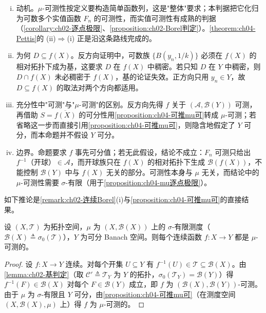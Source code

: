 \documentclass[../../main.tex]{subfiles}%
\begin{document}
\begin{remark}\label{remark:ch04-可分值判据动机}
\begin{enumerate}[(i)]
\item 动机。$\mu$-可测性按定义要构造简单函数列，这是"整体"要求；本判据把它化归为可数多个实值函数 $F_n$ 的可测性，而实值可测性有成熟的判据（\cref{corollary:ch02-逐点极限}、\cref{proposition:ch02-Borel判定}）。\cref{theorem:ch04-Pettis}的 (ii)$\Rightarrow$(i) 正是沿这条路线完成的。
\item 为何 $D\subseteq f(X)$。反方向证明中，可数族 $\{B(y_n,1/k)\}$ 必须在 $f(X)$ 的相对拓扑下成为基，这要求 $D$ 在 $f(X)$ 中稠密。若只知 $D$ 在 $Y$ 中稠密，则 $D\cap f(X)$ 未必稠密于 $f(X)$，基的论证失效。正方向只用 $y_n\in Y$，故 $D\subseteq f(X)$ 的取法对两个方向都适用。
\item 充分性中"可测"与"$\mu$-可测"的区别。反方向先得 $f$ 关于 $(\mathcal{A},\mathcal{B}(Y))$ 可测，再借助 $S=\overline{f(X)}$ 的可分性用\cref{proposition:ch04-可推mu可}转成 $\mu$-可测；若省略这一步而直接引用\cref{proposition:ch04-可推mu可}，则隐含地假定了 $Y$ 可分，而本命题并不假设 $Y$ 可分。
\item 边界。命题要求 $f$ 事先可分值；若无此假设，结论不成立：$F_n$ 可测只给出 $f^{-1}$（开球）$\in\mathcal{A}$，而开球族只在 $f(X)$ 的相对拓扑下生成 $\mathcal{B}(f(X))$，不能控制 $\mathcal{B}(Y)$ 中与 $f(X)$ 无关的部分。可测性本身与 $\mu$ 无关，而结论中的 $\mu$-可测性需要 $\sigma$-有限（用于\cref{proposition:ch04-mu逐点极限}）。
\end{enumerate}
\end{remark}

如下推论是\cref{remark:ch02-连续Borel}(i)与\cref{proposition:ch04-可推mu可}的直接结果。

\begin{corollary}\label{corollary:ch04-连续可测}
设 $(X,\mathcal{T})$ 为拓扑空间，$\mu$ 为 $(X,\mathcal{B}(X))$ 上的 $\sigma$-有限测度（$\mathcal{B}(X)\triangleq\sigma_0(\mathcal{T})$），$Y$ 为可分 Banach 空间。则每个连续函数 $f:X\to Y$ 都是 $\mu$-可测的。
\end{corollary}

\begin{proof}
设 $f:X\to Y$ 连续。对每个开集 $U\subseteq Y$ 有 $f^{-1}(U)\in\mathcal{T}\subseteq\mathcal{B}(X)$。由\cref{lemma:ch02-基判定}（取 $\mathcal{C}'\triangleq\mathcal{T}_Y$ 为 $Y$ 的拓扑，$\sigma_0(\mathcal{T}_Y)=\mathcal{B}(Y)$）得 $f^{-1}(F)\in\mathcal{B}(X)$ 对每个 $F\in\mathcal{B}(Y)$ 成立，即 $f$ 为 $(\mathcal{B}(X),\mathcal{B}(Y))$-可测。由于 $\mu$ 为 $\sigma$-有限且 $Y$ 可分，由\cref{proposition:ch04-可推mu可}（在测度空间 $(X,\mathcal{B}(X),\mu)$ 上）得 $f$ 为 $\mu$-可测的。
\end{proof}
\end{document}
